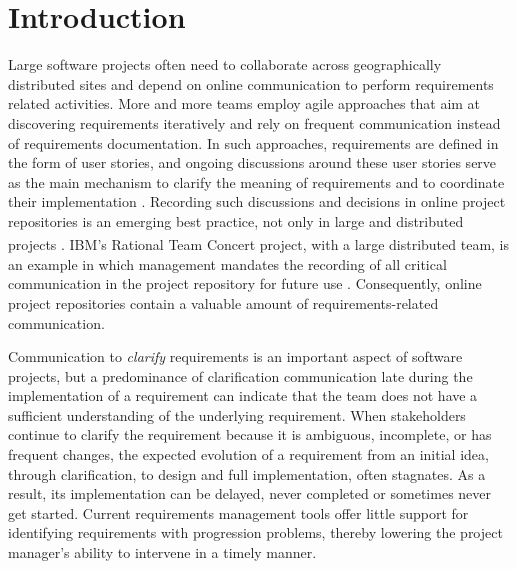 \section{Introduction}

Large software projects often  need to collaborate across geographically distributed sites and depend on online communication to perform requirements related activities. 
More and more teams employ agile approaches that aim at discovering requirements iteratively and rely on frequent communication instead of requirements documentation. 
In such approaches, requirements are defined in the form of user stories, and ongoing discussions around these user stories serve as the main mechanism to clarify the meaning of requirements and to coordinate their implementation \cite{Cao2008}. 
Recording such discussions and decisions in online project repositories is an emerging best practice, not only in large and distributed projects \cite{Aranda2007}.
IBM\textsuperscript{\textregistered}'s Rational Team Concert\textsuperscript{\textregistered} project, with a large distributed team, is an example in which management mandates the recording of all critical communication in the project repository for future use \cite{Frost2007}. 
Consequently, online project repositories contain a valuable amount of requirements-related communication.

Communication to \emph{clarify} requirements is an important aspect of software projects, but a predominance of clarification communication late during the implementation of a requirement can indicate that the team does not have a sufficient understanding of the underlying requirement. When stakeholders continue to clarify the requirement because it is ambiguous, incomplete, or has frequent changes, the expected evolution of a requirement from an initial idea, through clarification, to design and full implementation, often stagnates. 
As a result, its implementation can be delayed, never completed or sometimes never get started. 
Current requirements management tools offer little support for identifying requirements with progression problems, thereby lowering the project manager's  ability to intervene in a timely manner.

